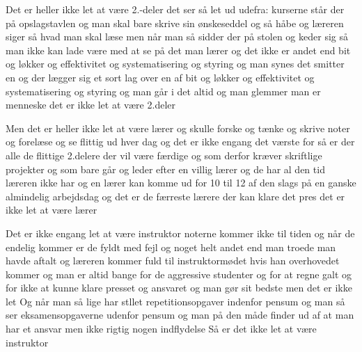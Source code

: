 \documentclass[a4paper,11pt]{article}
\begin{document}
\begin{sketch}
         Det er heller ikke let at være 2.-deler
         det ser så let ud udefra:
                kurserne står der på opslagstavlen
         og man skal bare skrive sin ønskeseddel og så håbe
         og læreren siger så hvad man skal læse
         men når man så sidder der på stolen og
                keder sig så man ikke kan lade være med at se på
                det man lærer
         og det ikke er andet end
                bit og løkker og effektivitet og systematisering og styring
         og man synes det smitter en og der lægger sig et sort lag
                over en af bit og løkker og effektivitet og systematisering
                og styring og man går i det altid og man glemmer
                man er menneske
         det er ikke let at være 2.deler

         Men det er heller ikke let at være lærer
                og skulle forske og tænke og skrive noter og forelæse
                og se flittig ud hver dag
         og det er ikke engang det værste
         for så er der alle de flittige 2.delere der vil være færdige
         og som derfor kræver skriftlige projekter og som
                bare går og
                leder efter en villig lærer og de har
                al den tid læreren ikke har
         og en lærer kan komme ud for 10 til 12 af den slags
         på en ganske almindelig arbejdsdag
         og det er de færreste lærere der kan klare det pres
         det er ikke let at være lærer

         Det er ikke engang let at være instruktor
                noterne kommer ikke til tiden
         og når de endelig kommer er de fyldt med fejl og noget
                helt andet end man troede man havde aftalt
         og læreren kommer fuld til instruktormødet
                hvis han overhovedet kommer
         og man er altid bange for de aggressive studenter og for
                at regne galt og for ikke at kunne klare presset og
                ansvaret og man gør sit bedste
         men det er ikke let
                Og når man så lige har stllet repetitionsopgaver
                indenfor pensum
                og man så ser eksamensopgaverne
                udenfor pensum
         og man på den måde finder ud af
                at man har et ansvar men ikke rigtig nogen indflydelse
         Så er det ikke let at være instruktor


\end{sketch}
\end{document}
